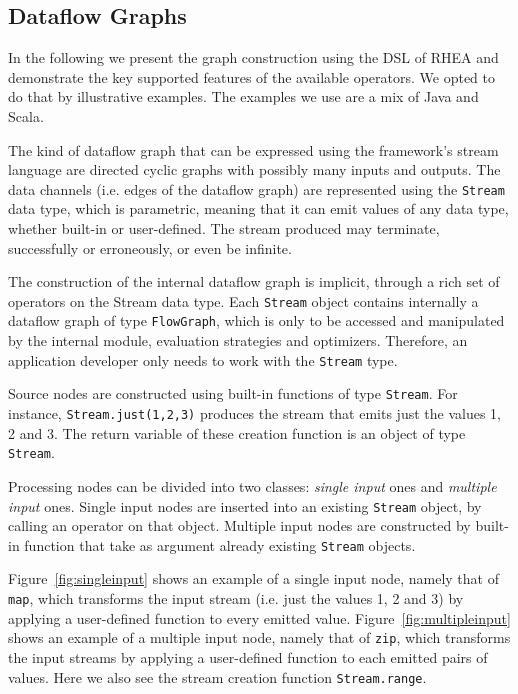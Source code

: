 \documentclass[sigplan,screen,review,anonymous]{acmart}
\begin{document}
\subsection{Dataflow Graphs}

In the following we present the graph construction using the DSL of RHEA and
demonstrate the key supported features of the available operators. We opted to
do that by illustrative examples. The examples we use are a mix of Java and Scala.

The kind of dataflow graph that can be expressed using the framework's stream
language are directed cyclic graphs with possibly many inputs and outputs.
%
The data channels (i.e. edges of the dataflow graph) are represented using the
\texttt{Stream} data type, which is parametric, meaning that it can emit values
of any data type, whether built-in or user-defined. The stream produced may
terminate, successfully or erroneously, or even be infinite.

The construction of the internal dataflow graph is implicit, through a
rich set of operators on the Stream data type. Each \texttt{Stream} object
contains internally a dataflow graph of type \texttt{FlowGraph}, which is only
to be accessed and manipulated by the internal module, evaluation strategies and
optimizers. Therefore, an application developer only needs to work with the
\texttt{Stream} type.

Source nodes are constructed using built-in functions of type \texttt{Stream}.
For instance, \texttt{Stream.just(1,2,3)} produces the stream that emits just
the values 1, 2 and 3. The return variable of these creation function is an
object of type \texttt{Stream}.

Processing nodes can be divided into two classes: \textit{single input} ones and
\textit{multiple input} ones.
%
Single input nodes are inserted into an existing \texttt{Stream} object, by
calling an operator on that object.
Multiple input nodes are constructed by built-in function that take as
argument already existing \texttt{Stream} objects.

%
%
Figure~\ref{fig:singleinput} shows an
example of a single input node, namely that of \texttt{map}, which transforms
the input stream (i.e. just the values 1, 2 and 3) by applying a user-defined
function to every emitted value.
%
Figure~\ref{fig:multipleinput} shows
an example of a multiple input node, namely that of \texttt{zip}, which
transforms the input streams by
applying a user-defined function to each emitted pairs of values.
Here we also see the stream creation function \texttt{Stream.range}.
%
\end{document}
